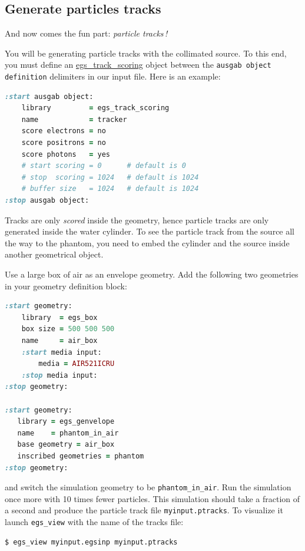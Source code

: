 \documentclass[12pt,twoside]{article}
\begin{document}
\subsection{Generate particles tracks}

And now comes the fun part: \textit{particle tracks\,!}

You will be generating particle tracks with the collimated source. To this end,
you must define an \href{http://nrc-cnrc.github.io/EGSnrc/doc/pirs898/classEGS__TrackScoring.html}{egs\_track\_scoring} object between the
\Verb+ausgab object definition+ delimiters in our input file. Here is an example:
\begin{lstlisting}[language=ruby,backgroundcolor=\color{white}]
:start ausgab object:
    library         = egs_track_scoring
    name            = tracker
    score electrons = no
    score positrons = no
    score photons   = yes
    # start scoring = 0      # default is 0
    # stop  scoring = 1024   # default is 1024
    # buffer size   = 1024   # default is 1024
:stop ausgab object:
\end{lstlisting}

Tracks are only \textit{scored} inside the geometry, hence particle tracks are only generated inside the water cylinder. To see the particle track from the source all the way to the phantom, you need to embed the cylinder and the source inside another geometrical object.

Use a large box of air as an envelope geometry. Add the following two geometries in your geometry definition block:
\begin{lstlisting}[language=ruby,backgroundcolor=\color{white}]
:start geometry:
    library  = egs_box
    box size = 500 500 500
    name     = air_box
    :start media input:
        media = AIR521ICRU
    :stop media input:
:stop geometry:

:start geometry:
   library = egs_genvelope
   name    = phantom_in_air
   base geometry = air_box
   inscribed geometries = phantom
:stop geometry:
\end{lstlisting}

and switch the simulation geometry to be \Verb+phantom_in_air+. Run the
simulation once more with 10 times fewer particles.
This simulation should take a fraction of a second and produce the particle
track file \Verb+myinput.ptracks+. To visualize it launch \Verb+egs_view+ with the name of the tracks file:

\begin{lstlisting}
$ egs_view myinput.egsinp myinput.ptracks
\end{lstlisting}
\end{document}
